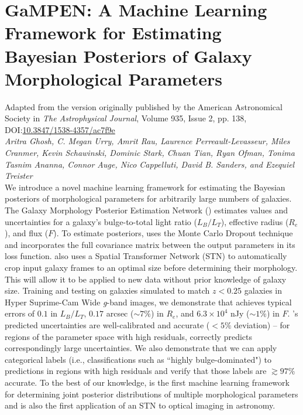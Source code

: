 \chapter{GaMPEN: A Machine Learning Framework for Estimating Bayesian Posteriors of Galaxy Morphological Parameters \label{ch:gampen}}

Adapted from the version originally published by the American Astronomical Society in \textit{The Astrophysical Journal}, Volume 935, Issue 2, pp. 138, DOI:\href{https://iopscience.iop.org/article/10.3847/1538-4357/ac7f9e}{10.3847/1538-4357/ac7f9e}\\
{\large \emph{Aritra Ghosh, C. Megan Urry, Amrit Rau, Laurence Perreault-Levasseur, Miles Cranmer, Kevin Schawinski, Dominic Stark, Chuan Tian, Ryan Ofman, Tonima Tasnim Ananna, Connor Auge, Nico Cappelluti, David B. Sanders, and Ezequiel Treister} }\\


We introduce a novel machine learning framework for estimating the Bayesian posteriors of morphological parameters for arbitrarily large numbers of galaxies.
The Galaxy Morphology Posterior Estimation Network (\gampen{}) 
estimates values and uncertainties for a galaxy's bulge-to-total light ratio ($L_B/L_T$), effective radius ($R_e$), and flux ($F$). To estimate posteriors, \gampen{} uses the Monte Carlo Dropout technique and incorporates the full covariance matrix between the output parameters in its loss function. %
\gampen{} also uses a Spatial Transformer Network (STN) to automatically crop input galaxy frames to an optimal size before determining their morphology. This will allow it to be applied to new data without prior knowledge of galaxy size.
Training and testing \gampen{} on galaxies simulated to match $z < 0.25$ galaxies in Hyper Suprime-Cam Wide \textit{g}-band images, we demonstrate that \gampen{} achieves typical errors of $0.1$ in $L_B/L_T$, $0.17$ arcsec ($\sim 7\%$) in $R_e$, and $6.3\times10^4$ nJy ($\sim 1\%$) in $F$. \gampen{}'s predicted uncertainties
are well-calibrated and accurate ($<5\%$ deviation) -- for regions of the parameter space with high residuals, \gampen{} correctly predicts correspondingly large uncertainties.
We also demonstrate that we can apply categorical labels (i.e., classifications such as ``highly bulge-dominated") to predictions in regions with high residuals and verify that those labels are  $\gtrsim 97\%$ accurate. To the best of our knowledge, \gampen{} is the first machine learning framework for determining joint posterior distributions of multiple morphological parameters and is also the first application of an STN to optical imaging in astronomy.


